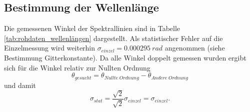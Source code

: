 \documentclass[12pt,a4paper]{article}
\begin{document}
\subsection{Bestimmung der Wellenlänge}

Die gemessenen Winkel der Spektrallinien sind in Tabelle \ref{tab:rohdaten_wellenlängen} dargestellt. Als statistischer Fehler auf die Einzelmessung wird weiterhin $\sigma_{einzel} = \SI{0.000295}{rad}$ angenommen (siehe Bestimmung Gitterkonstante). Da alle Winkel doppelt gemessen wurden ergibt sich für die Winkel relativ zur Nullten Ordnung
\begin{equation}
\theta_{gesucht} = \theta_{Nullte\;Ordnung} - \theta_{Andere\;Ordnung}
\end{equation}
und damit
\begin{equation}
\sigma_{stat} = \frac{\sqrt{2}}{\sqrt{2}} \sigma_{einzel} = \sigma_{einzel}.
\end{equation}
\end{document}
